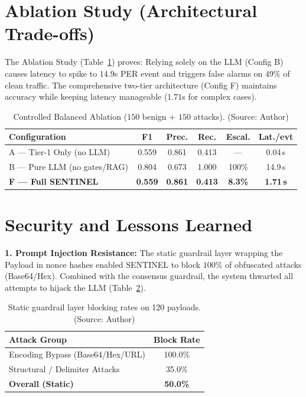 \section{Ablation Study (Architectural Trade-offs)}
The Ablation Study (Table~\ref{tab:ablation_balanced}) proves: Relying solely on the LLM (Config B) causes latency to spike to $14.9$s PER event and triggers false alarms on $49\%$ of clean traffic. The comprehensive two-tier architecture (Config F) maintains accuracy while keeping latency manageable ($1.71$s for complex cases).

\begin{table}[!htbp]
    \centering \footnotesize \setlength{\tabcolsep}{4pt}
    \caption{Controlled Balanced Ablation ($150$ benign $+$ $150$ attacks). (Source: Author)}
    \label{tab:ablation_balanced}
    \begin{tabular}{|>{\raggedright\arraybackslash}p{}|c|c|c|c|c|}
        \hline
        \textbf{Configuration} & \textbf{F1} & \textbf{Prec.} & \textbf{Rec.} & \textbf{Escal.} & \textbf{Lat./evt} \\ \hline
        A --- Tier-1 Only (no LLM) & 0.559 & 0.861 & 0.413 & --- & 0.04\,s \\ \hline
        B --- Pure LLM (no gates/RAG) & 0.804 & 0.673 & 1.000 & 100\% & 14.9\,s \\ \hline
        \textbf{F --- Full SENTINEL} & \textbf{0.559} & \textbf{0.861} & \textbf{0.413} & \textbf{8.3\%} & \textbf{1.71\,s} \\ \hline
    \end{tabular}
\end{table}

\section{Security and Lessons Learned}
\textbf{1. Prompt Injection Resistance:}
The static guardrail layer wrapping the Payload in nonce hashes enabled SENTINEL to block $100\%$ of obfuscated attacks (Base64/Hex). Combined with the consensus guardrail, the system thwarted all attempts to hijack the LLM (Table~\ref{tab:robustness}).

\begin{table}[!htbp]
    \centering
    \caption{Static guardrail layer blocking rates on 120 payloads. (Source: Author)}
    \label{tab:robustness}
    \begin{tabular}{|l|c|}
        \hline
        \textbf{Attack Group} & \textbf{Block Rate} \\ \hline
        Encoding Bypass (Base64/Hex/URL) & 100.0\% \\ \hline
        Structural / Delimiter Attacks & 35.0\% \\ \hline
        \textbf{Overall (Static)} & \textbf{50.0\%} \\ \hline
    \end{tabular}
\end{table}

